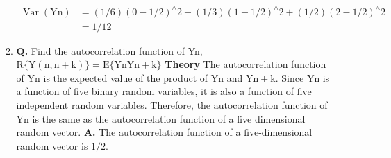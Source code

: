 \documentclass[main.tex]{subfiles}
\begin{document}
\begin{enumerate}
\begin{enumerate}
        $$
        \begin{aligned}
        \operatorname{Var}(\mathrm{Yn}) &= (1/6)(0-1/2)^{\wedge} 2 + (1/3)(1- 1/2)^{\wedge} 2 + (1 / 2)(2-1 / 2)^{\wedge}2 \\ 
        & = 1/12
        \end{aligned}
        $$
        
        \item \textbf{Q.} Find the autocorrelation function of Yn, $\mathrm{R}\{\mathrm{Y}(\mathrm{n}, \mathrm{n}+\mathrm{k})\}=\mathrm{E}\{\mathrm{Yn} \mathrm{Yn}+\mathrm{k}\}$ \textbf{Theory} The autocorrelation function of $\mathrm{Yn}$ is the expected value of the product of $\mathrm{Yn}$ and $\mathrm{Yn+k}$. Since $\mathrm{Yn}$ is a function of five binary random variables, it is also a function of five independent random variables. Therefore, the autocorrelation function of $\mathrm{Yn}$ is the same as the autocorrelation function of a five dimensional random vector. \textbf{A.} The autocorrelation function of a five-dimensional random vector is $1 / 2$.
        
    \end{enumerate}
    
\end{enumerate}
\end{document}
